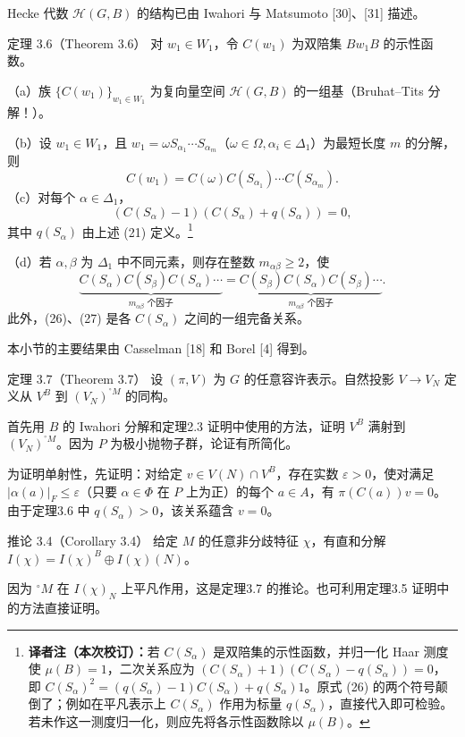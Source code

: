 Hecke 代数 $\mathcal H(G,B)$ 的结构已由 Iwahori 与 Matsumoto [30]、[31] 描述。
\begin{originaltheorem}{定理 3.6（Theorem 3.6）}
对 $w_1\in W_1$，令 $C(w_1)$ 为双陪集 $Bw_1B$ 的示性函数。

（a）族 $\{C(w_1)\}_{w_1\in W_1}$ 为复向量空间 $\mathcal H(G,B)$ 的一组基（Bruhat--Tits 分解！）。

（b）设 $w_1\in W_1$，且 $w_1=\omega S_{\alpha_1}\cdots S_{\alpha_m}$（$\omega\in\Omega,\alpha_i\in\Delta_1$）为最短长度 $m$ 的分解，则
\[
C(w_1)=C(\omega)C(S_{\alpha_1})\cdots C(S_{\alpha_m}).\tag{25}
\]
（c）对每个 $\alpha\in\Delta_1$，
\[
(C(S_\alpha)-1)(C(S_\alpha)+q(S_\alpha))=0,\tag{26}
\]
其中 $q(S_\alpha)$ 由上述 (21) 定义。\footnote{\textbf{译者注（本次校订）：}若 $C(S_\alpha)$ 是双陪集的示性函数，并归一化 Haar 测度使 $\mu(B)=1$，二次关系应为 $(C(S_\alpha)+1)(C(S_\alpha)-q(S_\alpha))=0$，即 $C(S_\alpha)^2=(q(S_\alpha)-1)C(S_\alpha)+q(S_\alpha)1$。原式 (26) 的两个符号颠倒了；例如在平凡表示上 $C(S_\alpha)$ 作用为标量 $q(S_\alpha)$，直接代入即可检验。若未作这一测度归一化，则应先将各示性函数除以 $\mu(B)$。}

（d）若 $\alpha,\beta$ 为 $\Delta_1$ 中不同元素，则存在整数 $m_{\alpha\beta}\geq2$，使
\[
\underbrace{C(S_\alpha)C(S_\beta)C(S_\alpha)\cdots}_{m_{\alpha\beta}\text{ 个因子}}
=\underbrace{C(S_\beta)C(S_\alpha)C(S_\beta)\cdots}_{m_{\alpha\beta}\text{ 个因子}}.\tag{27}
\]
此外，(26)、(27) 是各 $C(S_\alpha)$ 之间的一组完备关系。
\end{originaltheorem}
本小节的主要结果由 Casselman [18] 和 Borel [4] 得到。
\begin{originaltheorem}{定理 3.7（Theorem 3.7）}
设 $(\pi,V)$ 为 $G$ 的任意容许表示。自然投影 $V\to V_N$ 定义从 $V^B$ 到 $(V_N)^{{}^\circ M}$ 的同构。
\end{originaltheorem}
首先用 $B$ 的 Iwahori 分解和定理2.3 证明中使用的方法，证明 $V^B$ 满射到 $(V_N)^{{}^\circ M}$。因为 $P$ 为极小抛物子群，论证有所简化。

为证明单射性，先证明：对给定 $v\in V(N)\cap V^B$，存在实数 $\varepsilon>0$，使对满足 $|\alpha(a)|_F\leq\varepsilon$（只要 $\alpha\in\Phi$ 在 $P$ 上为正）的每个 $a\in A$，有 $\pi(C(a))v=0$。由于定理3.6 中 $q(S_\alpha)>0$，该关系蕴含 $v=0$。
\begin{originaltheorem}{推论 3.4（Corollary 3.4）}
给定 $M$ 的任意非分歧特征 $\chi$，有直和分解 $I(\chi)=I(\chi)^B\oplus I(\chi)(N)$。
\end{originaltheorem}
因为 $^\circ M$ 在 $I(\chi)_N$ 上平凡作用，这是定理3.7 的推论。也可利用定理3.5 证明中的方法直接证明。

